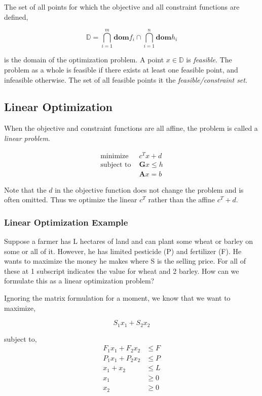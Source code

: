 \documentclass{article}
\newcommand{\dom}{\ensuremath{\mathbf{dom}}}
\begin{document}
The set of all points for which the objective and all constraint functions are defined,

\begin{equation}
    \mathbb{D} = \bigcap_{i = 1}^{m} \dom f_i \cap \bigcap_{i = 1}^{n} \dom h_i
\end{equation}

\noindent
is the domain of the optimization problem. A point $x \in \mathbb{D}$ is {\em feasible\/}. The problem as a whole is feasible if there exists at least one feasible point, and infeasible otherwise.
The set of all feasible points it the {\em feasible/constraint set}.

\subsection{Linear Optimization}

When the objective and constraint functions are all affine, the problem is called a {\em linear problem\/}.

\begin{align}
    \text{minimize }   & c^T x + d              \\
    \text{subject to } & \boldsymbol{G} x \le h \\
                       & \boldsymbol{A} x = b
\end{align}

Note that the $d$ in the objective function does not change the problem and is often omitted. Thus we optimize the linear $c^T$ rather than the affine $c^T + d$.

\subsubsection{Linear Optimization Example}

Suppose a farmer has L hectares of land and can plant some wheat or barley on some or all of it. However, he has limited pesticide (P) and fertilizer (F). He wants to maximize the money he makes where S is the selling price. For all of these at 1 subscript indicates the value for wheat and 2 barley. How can we formulate this as a linear optimization problem?

Ignoring the matrix formulation for a moment, we know that we want to maximize,

\begin{equation}
    S_1 x_1 + S_2 x_2
\end{equation}

\noindent
subject to,
\begin{align}
    F_1 x_1 + F_2 x_2 & \leq F \\
    P_1 x_1 + P_2 x_2 & \leq P \\
    x_1 + x_2         & \leq L \\
    x_1               & \geq 0 \\
    x_2               & \geq 0
\end{align}
\end{document}

